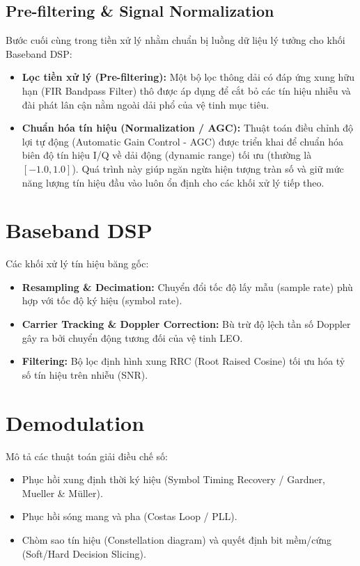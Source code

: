\documentclass[11pt,a4paper]{article}
\begin{document}
\subsection{Pre-filtering \& Signal Normalization}
Bước cuối cùng trong tiền xử lý nhằm chuẩn bị luồng dữ liệu lý tưởng cho khối Baseband DSP:
\begin{itemize}
    \item \textbf{Lọc tiền xử lý (Pre-filtering):} Một bộ lọc thông dải có đáp ứng xung hữu hạn (FIR Bandpass Filter) thô được áp dụng để cắt bỏ các tín hiệu nhiễu và đài phát lân cận nằm ngoài dải phổ của vệ tinh mục tiêu.
    \item \textbf{Chuẩn hóa tín hiệu (Normalization / AGC):} Thuật toán điều chỉnh độ lợi tự động (Automatic Gain Control - AGC) được triển khai để chuẩn hóa biên độ tín hiệu I/Q về dải động (dynamic range) tối ưu (thường là $[-1.0, 1.0]$). Quá trình này giúp ngăn ngừa hiện tượng tràn số và giữ mức năng lượng tín hiệu đầu vào luôn ổn định cho các khối xử lý tiếp theo.
\end{itemize}

\section{Baseband DSP}
Các khối xử lý tín hiệu băng gốc:
\begin{itemize}
    \item \textbf{Resampling \& Decimation:} Chuyển đổi tốc độ lấy mẫu (sample rate) phù hợp với tốc độ ký hiệu (symbol rate).
    \item \textbf{Carrier Tracking \& Doppler Correction:} Bù trừ độ lệch tần số Doppler gây ra bởi chuyển động tương đối của vệ tinh LEO.
    \item \textbf{Filtering:} Bộ lọc định hình xung RRC (Root Raised Cosine) tối ưu hóa tỷ số tín hiệu trên nhiễu (SNR).
\end{itemize}

\section{Demodulation}
Mô tả các thuật toán giải điều chế số:
\begin{itemize}
    \item Phục hồi xung định thời ký hiệu (Symbol Timing Recovery / Gardner, Mueller \& Müller).
    \item Phục hồi sóng mang và pha (Costas Loop / PLL).
    \item Chòm sao tín hiệu (Constellation diagram) và quyết định bit mềm/cứng (Soft/Hard Decision Slicing).
\end{itemize}
\end{document}
